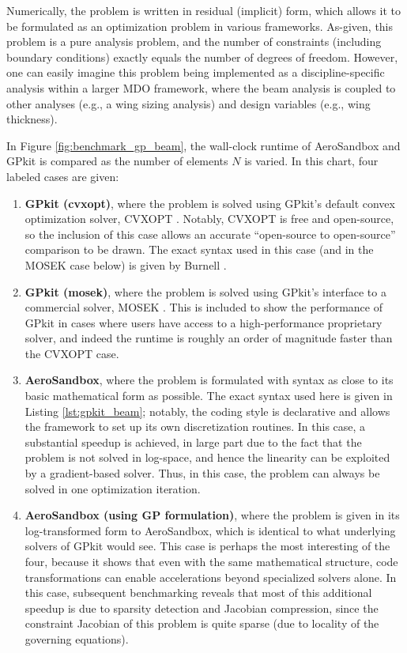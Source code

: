 Numerically, the problem is written in residual (implicit) form, which allows it to be formulated as an optimization problem in various frameworks. As-given, this problem is a pure analysis problem, and the number of constraints (including boundary conditions) exactly equals the number of degrees of freedom. However, one can easily imagine this problem being implemented as a discipline-specific analysis within a larger MDO framework, where the beam analysis is coupled to other analyses (e.g., a wing sizing analysis) and design variables (e.g., wing thickness).

In Figure \ref{fig:benchmark_gp_beam}, the wall-clock runtime of AeroSandbox and GPkit is compared as the number of elements $N$ is varied. In this chart, four labeled cases are given:
\begin{enumerate}
    \item \textbf{GPkit (cvxopt)}, where the problem is solved using GPkit's default convex optimization solver, CVXOPT \cite{cvxopt}. Notably, CVXOPT is free and open-source, so the inclusion of this case allows an accurate ``open-source to open-source'' comparison to be drawn. The exact syntax used in this case (and in the MOSEK case below) is given by Burnell \cite{gpkit_beam}.
    \item \textbf{GPkit (mosek)}, where the problem is solved using GPkit's interface to a commercial solver, MOSEK \cite{mosek}. This is included to show the performance of GPkit in cases where users have access to a high-performance proprietary solver, and indeed the runtime is roughly an order of magnitude faster than the CVXOPT case.
    \item \textbf{AeroSandbox}, where the problem is formulated with syntax as close to its basic mathematical form as possible. The exact syntax used here is given in Listing \ref{lst:gpkit_beam}; notably, the coding style is declarative and allows the framework to set up its own discretization routines. In this case, a substantial speedup is achieved, in large part due to the fact that the problem is not solved in log-space, and hence the linearity can be exploited by a gradient-based solver. Thus, in this case, the problem can always be solved in one optimization iteration.
    \item \textbf{AeroSandbox (using GP formulation)}, where the problem is given in its log-transformed form to AeroSandbox, which is identical to what underlying solvers of GPkit would see. This case is perhaps the most interesting of the four, because it shows that even with the same mathematical structure, code transformations can enable accelerations beyond specialized solvers alone. In this case, subsequent benchmarking reveals that most of this additional speedup is due to sparsity detection and Jacobian compression, since the constraint Jacobian of this problem is quite sparse (due to locality of the governing equations).
\end{enumerate}

